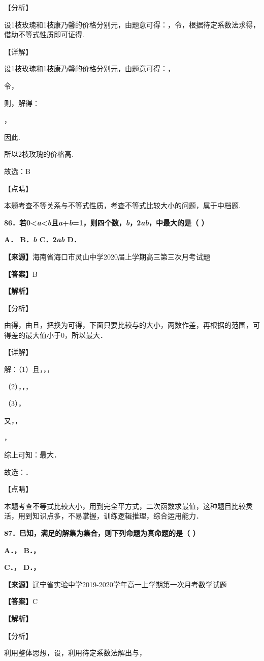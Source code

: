 【分析】

设1枝玫瑰和1枝康乃馨的价格分别元，由题意可得：，令，根据待定系数法求得，借助不等式性质即可证得.

【详解】

设1枝玫瑰和1枝康乃馨的价格分别元，由题意可得：，

令，

则，解得：

，

因此.

所以2枝玫瑰的价格高.

故选：B

【点睛】

本题考查不等关系与不等式性质，考查不等式比较大小的问题，属于中档题.

\textbf{86．若0\textless{}\emph{a}\textless{}\emph{b}且\emph{a}+\emph{b}=1，则四个数，\emph{b}，2\emph{ab}，中最大的是（
）}

\textbf{A． B．\emph{b} C．2\emph{ab} D．}

\textbf{【来源】}海南省海口市灵山中学2020届上学期高三第三次月考试题

\textbf{【答案】}B

\textbf{【解析】}

【分析】

由得，由且，把换为可得，下面只要比较与的大小，两数作差，再根据的范围，可得差的最大值小于0，所以最大．

【详解】

解：（1）且，，，

（2），，，

（3），

又，，

，

综上可知：最大．

故选：．

【点睛】

本题考查不等式比较大小，用到完全平方式，二次函数求最值，这种题目比较灵活，用到知识点多，不易掌握，训练逻辑推理，综合运用能力．

\textbf{87．已知，满足的解集为集合，则下列命题为真命题的是（ ）}

\textbf{A．， B．，}

\textbf{C．， D．，}

\textbf{【来源】}辽宁省实验中学2019-2020学年高一上学期第一次月考数学试题

\textbf{【答案】}C

\textbf{【解析】}

【分析】

利用整体思想，设，利用待定系数法解出与，

